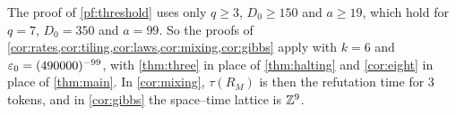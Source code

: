 \begin{remark}\label{thr:corollaries}
The proof of \cref{pf:threshold} uses only $q\ge3$, $D_0\ge150$ and $a\ge19$, which hold for $q=7$, $D_0=350$ and $a=99$. So the proofs of \cref{cor:rates,cor:tiling,cor:laws,cor:mixing,cor:gibbs} apply with $k=6$ and $\varepsilon_0=(490000)^{-99}$, with \cref{thm:three} in place of \cref{thm:halting} and \cref{cor:eight} in place of \cref{thm:main}. In \cref{cor:mixing}, $\tau(R_M)$ is then the refutation time for $3$ tokens, and in \cref{cor:gibbs} the space--time lattice is $\mathbb{Z}^9$.
\end{remark}



